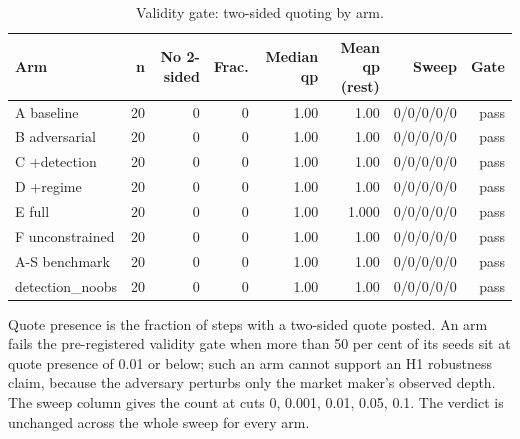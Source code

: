 \begin{table}[htbp]
  \centering
  \caption{Validity gate: two-sided quoting by arm.}
  \label{tab:validity}
  \begin{tabular}{lrrrrrrr}
    \toprule
    Arm & n & No 2-sided & Frac. & Median qp & Mean qp (rest) & Sweep & Gate \\
    \midrule
    A  baseline & 20 & 0 & 0 & 1.00 & 1.00 & 0/0/0/0/0 & pass \\
    B  adversarial & 20 & 0 & 0 & 1.00 & 1.00 & 0/0/0/0/0 & pass \\
    C  +detection & 20 & 0 & 0 & 1.00 & 1.00 & 0/0/0/0/0 & pass \\
    D  +regime & 20 & 0 & 0 & 1.00 & 1.00 & 0/0/0/0/0 & pass \\
    E  full & 20 & 0 & 0 & 1.00 & 1.000 & 0/0/0/0/0 & pass \\
    F  unconstrained & 20 & 0 & 0 & 1.00 & 1.00 & 0/0/0/0/0 & pass \\
    A-S benchmark & 20 & 0 & 0 & 1.00 & 1.00 & 0/0/0/0/0 & pass \\
    detection\_noobs & 20 & 0 & 0 & 1.00 & 1.00 & 0/0/0/0/0 & pass \\
    \bottomrule
  \end{tabular}
  \begin{minipage}{\linewidth}\vspace{4pt}\footnotesize Quote presence is the fraction of steps with a two-sided quote posted. An arm fails the pre-registered validity gate when more than 50 per cent of its seeds sit at quote presence of 0.01 or below; such an arm cannot support an H1 robustness claim, because the adversary perturbs only the market maker's observed depth. The sweep column gives the count at cuts 0, 0.001, 0.01, 0.05, 0.1. The verdict is unchanged across the whole sweep for every arm.\end{minipage}
\end{table}
